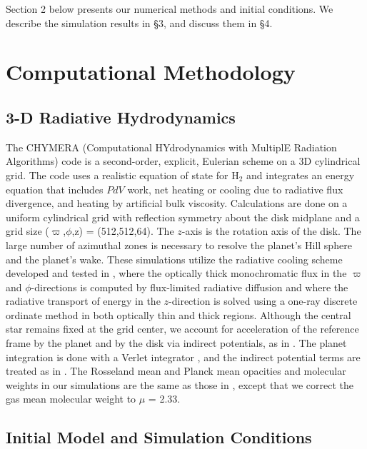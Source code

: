 \documentclass[12pt,manuscript,authoryear]{aastex}
\begin{document}
Section 2 below presents our numerical methods and initial conditions.  We describe the simulation results in \S3, and
discuss them in \S4.

\section{Computational Methodology}

\subsection{3-D Radiative Hydrodynamics}

The CHYMERA (Computational HYdrodynamics with MultiplE Radiation Algorithms) code \citep{boley2007b} is a second-order,
explicit, Eulerian scheme on a 3D cylindrical grid. The code uses a realistic equation of state for H$_2$
\citep{boley2007} and integrates an energy equation that includes $PdV$ work, net heating or cooling due to radiative
flux divergence, and heating by artificial bulk viscosity. Calculations are done on a uniform cylindrical grid with
reflection symmetry about the disk midplane and a grid size ($\varpi$,$\phi$,z) = (512,512,64).  The $z$-axis is the
rotation axis of the disk. The large number of azimuthal zones is necessary to resolve the planet's Hill sphere and the
planet's wake. These simulations utilize the radiative cooling scheme developed and tested in \citet{boley2007b}, where
the optically thick monochromatic flux in the $\varpi$ and $\phi$-directions is computed by flux-limited radiative
diffusion and where the radiative transport of energy in the $z$-direction is solved using a one-ray discrete ordinate
method in both optically thin and thick regions. Although the central star remains fixed at the grid center, we account
for acceleration of the reference frame by the planet and by the disk via indirect potentials, as in
\citet{michael2010}. The planet integration is done with a Verlet integrator \citep[e.g.,][]{hut1995}, and the indirect
potential terms are treated as in \citet{nelson2000a}. The Rosseland mean and Planck mean opacities and molecular
weights in our simulations are the same as those in \citet{boley2006,boley2007b}, except that we correct the
\citet{dalessio2001} gas mean molecular weight to $\mu$ = 2.33.

\subsection{Initial Model and Simulation Conditions}
\end{document}
